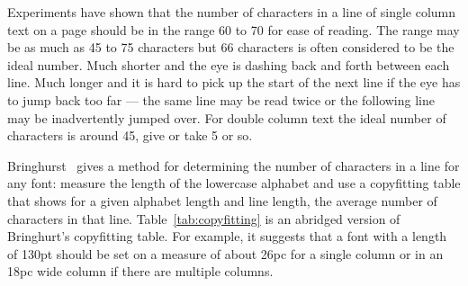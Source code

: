 \documentclass[10pt,letterpaper,extrafontsizes]{memoir}
\begin{document}
    Experiments have shown that the number of characters in a line of
single column text on a page should be
in the range 60 to 70 for ease of reading. The range may be as much
as 45 to 75 characters but 66 characters is often
considered to be the ideal number. Much shorter and the eye is dashing
back and forth between each line. Much longer and it is hard to pick up the
start of the next line if the eye has to jump back too far --- the same line
may be read twice or the following line may be inadvertently jumped over.
For double column text the ideal number of characters 
is around 45, give or take 5 or so.

    Bringhurst~\autocite{BRINGHURST99} gives a 
method for determining the number
of characters in a line for any font: 
measure the length of the lowercase alphabet and use a 
copyfitting 
table that shows for a given alphabet 
length and line length, the average number of characters in that line.
 Table~\ref{tab:copyfitting} is an
abridged version of Bringhurt's copyfitting table.
For example, it suggests that a font with a length of 130pt should be
set on a measure of about 26pc for a single column 
or in an 18pc wide column if there are multiple 
columns.
 
\end{document}
